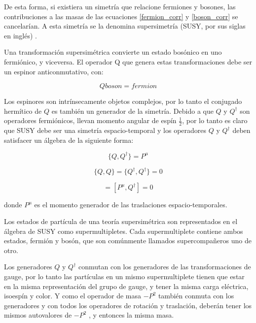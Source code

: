 De esta forma, si existiera un simetría que relacione fermiones y bosones, las contribuciones a las masas de las ecuaciones \ref{fermion_corr} y \ref{boson_corr} se cancelarían. A esta simetría se la denomina supersimetría (SUSY, por sus siglas en inglés) \cite{Martin:1997ns}.

Una transformación supersimétrica convierte un estado bosónico en uno fermiónico, y viceversa. El operador Q que genera estas transformaciones debe ser un espinor anticonmutativo, con:

\begin{equation}
Q boson= fermion
\end{equation}

Los espinores son intrínsecamente objetos complejos, por lo tanto el conjugado hermítico de $Q$ es también un generador de la simetría. Debido a que $Q$ y $Q^{\dagger}$ son operadores fermiónicos, llevan momento angular de espín $\frac{1}{2}$, por lo tanto es claro que SUSY debe ser una simetría espacio-temporal y los operadores $Q$ y $Q^{\dagger}$ deben satisfacer un álgebra de la siguiente forma:

\begin{equation}
\{Q,Q^{\dagger}\}=P^{\mu}
\end{equation}

\begin{equation}
\{Q,Q\}=\{Q^{\dagger},Q^{\dagger}\}=0
\end{equation}

\begin{equation}
[P^{\mu},Q]=[P^{\mu},Q^{\dagger}]=0
\end{equation}

donde $P^{\mu}$ es el momento generador de las traslaciones espacio-temporales.

Los estados de partícula de una teoría supersimétrica son representados en el álgebra de SUSY como supermultipletes. Cada supermultiplete contiene ambos estados, fermión y bosón, que son comúnmente llamados supercompañeros uno de otro.

Los generadores $Q$ y $Q^{\dagger}$ conmutan con los generadores de las transformaciones de gauge, por lo tanto las partículas en un mismo supermultiplete tienen que estar en la misma representación del grupo de gauge, y tener la misma carga eléctrica, isoespín y color. Y como el operador de masa $-P^{2}$ también conmuta con los generadores y con todos los operadores de rotación y traslación, deberán tener los mismos autovalores de $-P^{2}$ , y entonces la misma masa.

